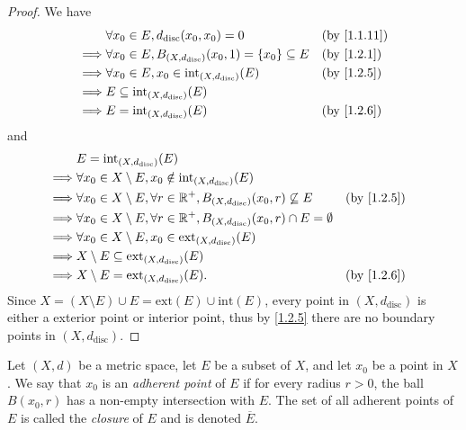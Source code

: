 \begin{proof}
  We have
  \begin{align*}
             & \forall x_0 \in E, d_{\text{disc}}(x_0, x_0) = 0                            &  & \by{1.1.11} \\
    \implies & \forall x_0 \in E, B_{(X, d_{\text{disc}})}(x_0, 1) = \set{x_0} \subseteq E &  & \by{1.2.1}  \\
    \implies & \forall x_0 \in E, x_0 \in \text{int}_{(X, d_{\text{disc}})}(E)             &  & \by{1.2.5}  \\
    \implies & E \subseteq \text{int}_{(X, d_{\text{disc}})}(E)                                             \\
    \implies & E = \text{int}_{(X, d_{\text{disc}})}(E)                                    &  & \by{1.2.6}
  \end{align*}
  and
  \begin{align*}
             & E = \text{int}_{(X, d_{\text{disc}})}(E)                                                                               \\
    \implies & \forall x_0 \in X \setminus E, x_0 \notin \text{int}_{(X, d_{\text{disc}})}(E)                                         \\
    \implies & \forall x_0 \in X \setminus E, \forall r \in \R^+, B_{(X, d_{\text{disc}})}(x_0, r) \not\subseteq E    &  & \by{1.2.5} \\
    \implies & \forall x_0 \in X \setminus E, \forall r \in \R^+, B_{(X, d_{\text{disc}})}(x_0, r) \cap E = \emptyset                 \\
    \implies & \forall x_0 \in X \setminus E, x_0 \in \text{ext}_{(X, d_{\text{disc}})}(E)                                            \\
    \implies & X \setminus E \subseteq \text{ext}_{(X, d_{\text{disc}})}(E)                                                           \\
    \implies & X \setminus E = \text{ext}_{(X, d_{\text{disc}})}(E).                                                  &  & \by{1.2.6}
  \end{align*}
  Since \(X = (X \setminus E) \cup E = \text{ext}(E) \cup \text{int}(E)\), every point in \((X, d_{\text{disc}})\) is either a exterior point or interior point, thus by \cref{1.2.5} there are no boundary points in \((X, d_{\text{disc}})\).
\end{proof}

\begin{defn}[Closure]\label{1.2.9}
  Let \((X, d)\) be a metric space, let \(E\) be a subset of \(X\), and let \(x_0\) be a point in \(X\).
  We say that \(x_0\) is an \emph{adherent point} of \(E\) if for every radius \(r > 0\), the ball \(B(x_0, r)\) has a non-empty intersection with \(E\).
  The set of all adherent points of \(E\) is called the \emph{closure} of \(E\) and is denoted \(\overline{E}\).
\end{defn}

